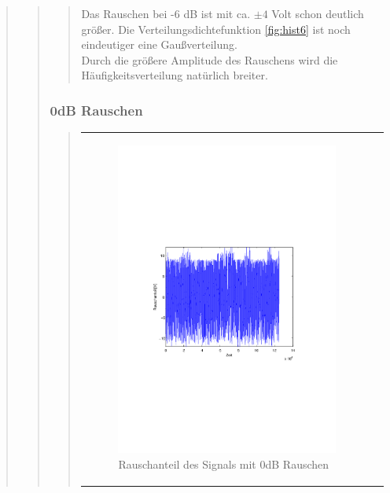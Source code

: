 \begin{quote}
\begin{quote}
\begin{quote}
            Das Rauschen bei -6 dB ist mit ca. $\pm 4$ Volt schon deutlich größer. Die Verteilungsdichtefunktion \ref{fig:hist6}
            ist noch eindeutiger eine Gaußverteilung.\\
            Durch die größere Amplitude des Rauschens wird die Häufigkeitsverteilung natürlich breiter.
            
            
        \end{quote}
        
        \subsubsection{0dB Rauschen}
        \begin{quote}
        \begin{center}
        \begin{tabular}{ll}
        
        \hspace{-16.5em}
            \begin{minipage}{0.6\textwidth}
                
                \begin{figure}[H]
                    \label{fig:funktion0alpha}
                    \includegraphics[scale=0.7, trim = 20mm 80mm 20mm 90mm, clip]{Bilder/rau0}
                    \caption{Rauschanteil des Signals mit 0dB Rauschen}
                \end{figure}
                

\end{minipage}
\end{tabular}
\end{center}
\end{quote}
\end{quote}
\end{quote}
